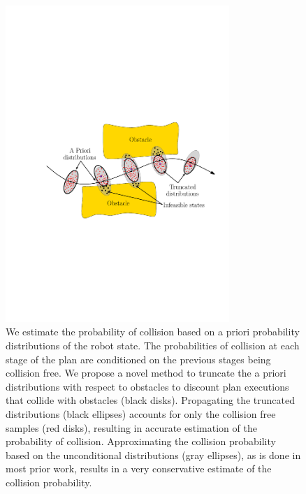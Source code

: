 \begin{figure}[t]
\centering
\includegraphics[width=240pt,clip]{figures/truncatedGaussians3.pdf}
\vspace{-5pt}
\caption{We estimate the probability of collision based on a priori probability distributions of the robot state. The probabilities of collision at each stage of the plan are conditioned on the previous stages being collision free. We propose a novel method to truncate the a priori distributions with respect to obstacles to discount plan executions that collide with obstacles (black disks). Propagating the truncated distributions (black ellipses) accounts for only the collision free samples (red disks), resulting in accurate estimation of the probability of collision. Approximating the collision probability based on the unconditional distributions (gray ellipses), as is done in most prior work, results in a very conservative estimate of the collision probability.}
\label{fig:teaser}
\vspace*{-10pt}
\end{figure}

